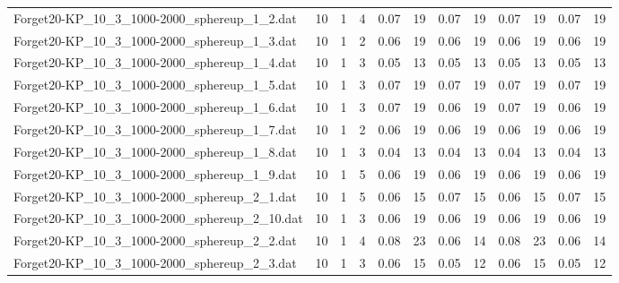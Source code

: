 \begin{sidewaystable}[!ht]
{\begin{tabular}{lccccccccccc}
Forget20-KP\_10\_3\_1000-2000\_sphereup\_1\_2.dat & 10 & 1 & 4 &  \textcolor{blue2}{0.07} & 19 &  \textcolor{blue2}{0.07} & 19 &  \textcolor{blue2}{0.07} & 19 &  \textcolor{blue2}{0.07} & 19 \\
Forget20-KP\_10\_3\_1000-2000\_sphereup\_1\_3.dat & 10 & 1 & 2 &  \textcolor{blue2}{0.06} & 19 &  \textcolor{blue2}{0.06} & 19 &  \textcolor{blue2}{0.06} & 19 &  \textcolor{blue2}{0.06} & 19 \\
Forget20-KP\_10\_3\_1000-2000\_sphereup\_1\_4.dat & 10 & 1 & 3 &  \textcolor{blue2}{0.05} & 13 &  \textcolor{blue2}{0.05} & 13 &  \textcolor{blue2}{0.05} & 13 &  \textcolor{blue2}{0.05} & 13 \\
Forget20-KP\_10\_3\_1000-2000\_sphereup\_1\_5.dat & 10 & 1 & 3 &  \textcolor{blue2}{0.07} & 19 &  \textcolor{blue2}{0.07} & 19 &  \textcolor{blue2}{0.07} & 19 &  \textcolor{blue2}{0.07} & 19 \\
Forget20-KP\_10\_3\_1000-2000\_sphereup\_1\_6.dat & 10 & 1 & 3 & 0.07 & 19 &  \textcolor{blue2}{0.06} & 19 & 0.07 & 19 &  \textcolor{blue2}{0.06} & 19 \\
Forget20-KP\_10\_3\_1000-2000\_sphereup\_1\_7.dat & 10 & 1 & 2 &  \textcolor{blue2}{0.06} & 19 &  \textcolor{blue2}{0.06} & 19 &  \textcolor{blue2}{0.06} & 19 &  \textcolor{blue2}{0.06} & 19 \\
Forget20-KP\_10\_3\_1000-2000\_sphereup\_1\_8.dat & 10 & 1 & 3 &  \textcolor{blue2}{0.04} & 13 &  \textcolor{blue2}{0.04} & 13 &  \textcolor{blue2}{0.04} & 13 &  \textcolor{blue2}{0.04} & 13 \\
Forget20-KP\_10\_3\_1000-2000\_sphereup\_1\_9.dat & 10 & 1 & 5 &  \textcolor{blue2}{0.06} & 19 &  \textcolor{blue2}{0.06} & 19 &  \textcolor{blue2}{0.06} & 19 &  \textcolor{blue2}{0.06} & 19 \\
Forget20-KP\_10\_3\_1000-2000\_sphereup\_2\_1.dat & 10 & 1 & 5 &  \textcolor{blue2}{0.06} & 15 & 0.07 & 15 &  \textcolor{blue2}{0.06} & 15 & 0.07 & 15 \\
Forget20-KP\_10\_3\_1000-2000\_sphereup\_2\_10.dat & 10 & 1 & 3 &  \textcolor{blue2}{0.06} & 19 &  \textcolor{blue2}{0.06} & 19 &  \textcolor{blue2}{0.06} & 19 &  \textcolor{blue2}{0.06} & 19 \\
Forget20-KP\_10\_3\_1000-2000\_sphereup\_2\_2.dat & 10 & 1 & 4 & 0.08 & 23 &  \textcolor{blue2}{0.06} & 14 & 0.08 & 23 &  \textcolor{blue2}{0.06} & 14 \\
Forget20-KP\_10\_3\_1000-2000\_sphereup\_2\_3.dat & 10 & 1 & 3 & 0.06 & 15 &  \textcolor{blue2}{0.05} & 12 & 0.06 & 15 &  \textcolor{blue2}{0.05} & 12 \\

\end{tabular}}
\end{sidewaystable}
